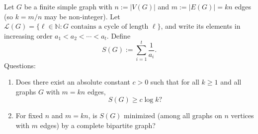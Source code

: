 Let $G$ be a finite simple graph with $n:=|V(G)|$ and $m:=|E(G)|=kn$ edges (so $k=m/n$ may be non-integer).
Let $\mathcal{L}(G)=\{\ell\in\mathbb{N}: G \text{ contains a cycle of length }\ell\}$, and write its elements in increasing 
order $a_1<a_2<\cdots<a_t$.
Define
\[
S(G):=\sum_{i=1}^t \frac{1}{a_i}.
\]
Questions:
\begin{enumerate}
\item Does there exist an absolute constant $c>0$ such that for all $k\ge1$ and all graphs $G$ with $m=kn$ edges,
\[ S(G)\ge c\log k?\]
\item For fixed $n$ and $m=kn$, is $S(G)$ minimized (among all graphs on $n$ vertices with $m$ edges) by a complete 
bipartite graph?
\end{enumerate}
